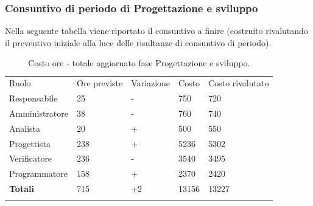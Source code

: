 \documentclass[a4paper]{article}
\begin{document}
				\subsubsection{Consuntivo di periodo di Progettazione e sviluppo}
					Nella seguente tabella viene riportato il consuntivo a finire (costruito rivalutando il preventivo iniziale alla luce delle risultanze 
					di consuntivo di periodo).
					\begin{table}[H]
						\begin{tabularx}{\textwidth}{Y Y Y Y Y}
							Ruolo & Ore previste & Variazione & Costo & Costo rivalutato\\
							Responsabile & 25 & - & 750 & 720 \\
							Amministratore & 38 & - & 760 & 740 \\
							Analista & 20 & + & 500 & 550\\
							Progettista & 238 & + & 5236 & 5302\\
							Verificatore & 236 & - & 3540 & 3495\\
							Programmatore & 158 & + & 2370 & 2420\\
							\textbf{Totali} & 715 & +2 & 13156 & 13227\\
						\end{tabularx}
					\caption{Costo ore - totale aggiornato fase Progettazione e sviluppo.}
					\label{TCRendicontati}
					\end{table}
                    
\end{document}
